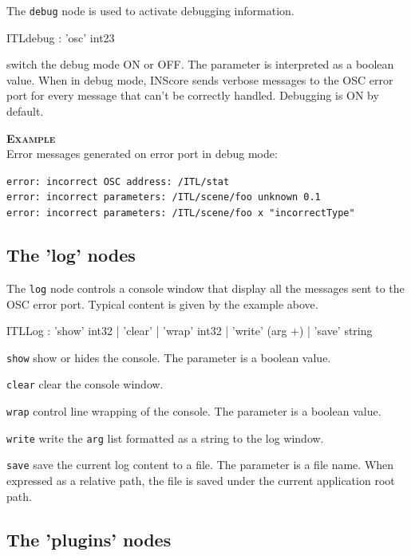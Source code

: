 \documentclass[a4paper,twoside]{report}
\newcommand{\subsublevel}[1]	{\subsection{#1}}
\newcommand{\OSC}[1]		{\texttt{#1}}
\newcommand{\example}		{\textbf{\hspace{-1.5cm}\textbf{\textsc{Example }}}}
\let\olditemize\itemize
\let\oldenditemize\enditemize
\renewenvironment{itemize} 	{\olditemize \setlength{\itemsep}{1mm}}{\oldenditemize}
\newcommand{\sample}	[1]			{\vspace{-2mm}\begin{center}\colorbox{mygrey}{
								\begin{minipage}[t]{0.9\columnwidth} 
								{\small \texttt{#1}}
								\end{minipage}}\end{center}}
\begin{document}
The \OSC{debug} node is used to activate debugging information.
\begin{rail}
ITLdebug : 'osc' int23
\end{rail}

\begin{itemize}
\item switch the debug mode ON or OFF. The parameter is interpreted as a boolean value. When in debug mode, INScore sends verbose messages to the OSC error port for every message that can't be correctly handled. Debugging is ON by default.
\end{itemize}

\example \\
Error messages generated on error port in debug mode:
\sample{error:  incorrect OSC address: /ITL/stat\\
error:  incorrect parameters: /ITL/scene/foo unknown 0.1\\
error:  incorrect parameters: /ITL/scene/foo x "incorrectType"
}


\subsublevel{The 'log' nodes}
\label{ITLlog}

The \OSC{log} node controls a console window that display all the messages sent to the OSC error port. Typical content is given by the example above.

\begin{rail}
ITLLog : 'show'  int32
		| 'clear'
		| 'wrap' int32
		| 'write' (arg +)
		| 'save' string
\end{rail}

\begin{itemize}
\item \OSC{show} show or hides the console. The parameter is a boolean value.
\item \OSC{clear} clear the console window.
\item \OSC{wrap} control line wrapping of the console. The parameter is a boolean value.
\item \OSC{write} write the \OSC{arg} list formatted as a string to the log window.
\item \OSC{save} save the current log content to a file. The parameter is a file name. When expressed as a relative path, the file is saved under the current application root path.
\end{itemize}



\subsublevel{The 'plugins' nodes}
\label{ITLplugins}
\end{document}

